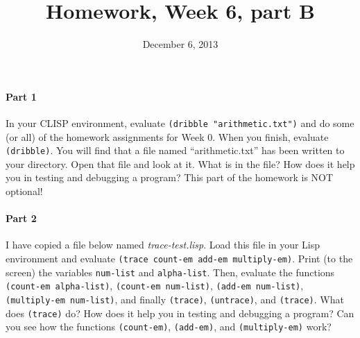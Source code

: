 \documentclass{article}
\title{Homework, Week 6, part B}
\date{December 6, 2013}
\begin{document}
\maketitle{}

\paragraph{Part 1}In your CLISP environment, evaluate \texttt{(dribble "arithmetic.txt")} and do some (or all) of the homework assignments for Week 0. When you finish, evaluate \texttt{(dribble)}. You will find that a file named ``arithmetic.txt'' has been written to your directory. Open that file and look at it. What is in the file? How does it help you in testing and debugging a program? This part of the homework is NOT optional!

\paragraph{Part 2}I have copied a file below named \textit{trace-test.lisp}. Load this file in your Lisp environment and evaluate \texttt{(trace count-em add-em multiply-em)}. Print (to the screen) the variables \texttt{num-list} and \texttt{alpha-list}. Then, evaluate the functions \texttt{(count-em alpha-list)}, \texttt{(count-em num-list)}, \texttt{(add-em num-list)}, \texttt{(multiply-em num-list)}, and finally \texttt{(trace)}, \texttt{(untrace)}, and \texttt{(trace)}. What does \texttt{(trace)} do? How does it help you in testing and debugging a program? Can you see how the functions \texttt{(count-em)}, \texttt{(add-em)}, and \texttt{(multiply-em)} work?
\end{document}
